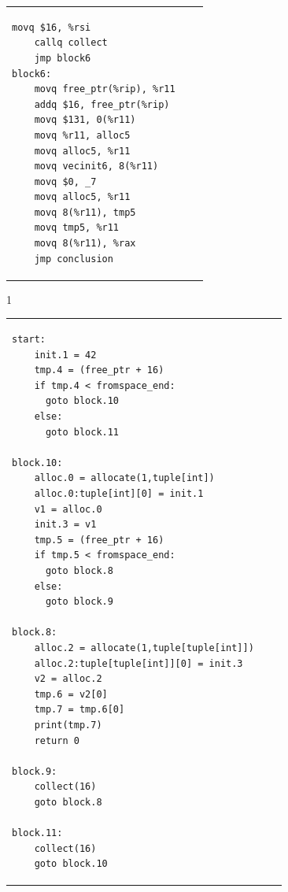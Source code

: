 \documentclass[7x10]{TimesAPriori_MIT}%
\def\pythonEd{1}
\providecommand{\BookEdition}{1}
\let\edition\BookEdition
\numberwithin{theorem}{chapter}
\numberwithin{definition}{chapter}
\numberwithin{equation}{chapter}
\begin{document}
\begin{figure}[tbp]
\begin{tcolorbox}[colback=white]
{\begin{tabular}{lll}
\begin{minipage}{0.4\textwidth}
\begin{lstlisting}[basicstyle=\ttfamily\scriptsize]
    movq $16, %rsi
    callq collect
    jmp block6
block6:
    movq free_ptr(%rip), %r11
    addq $16, free_ptr(%rip)
    movq $131, 0(%r11)
    movq %r11, alloc5
    movq alloc5, %r11
    movq vecinit6, 8(%r11)
    movq $0, _7
    movq alloc5, %r11
    movq 8(%r11), tmp5
    movq tmp5, %r11
    movq 8(%r11), %rax
    jmp conclusion
\end{lstlisting}
\end{minipage}
\end{tabular}
\fi}
{\if\edition\pythonEd    
\begin{tabular}{lll}
\begin{minipage}{0.5\textwidth}
\begin{lstlisting}[basicstyle=\ttfamily\scriptsize]
start:
    init.1 = 42
    tmp.4 = (free_ptr + 16)
    if tmp.4 < fromspace_end:
      goto block.10
    else:
      goto block.11

block.10:
    alloc.0 = allocate(1,tuple[int])
    alloc.0:tuple[int][0] = init.1
    v1 = alloc.0
    init.3 = v1
    tmp.5 = (free_ptr + 16)
    if tmp.5 < fromspace_end:
      goto block.8
    else:
      goto block.9

block.8:
    alloc.2 = allocate(1,tuple[tuple[int]])
    alloc.2:tuple[tuple[int]][0] = init.3
    v2 = alloc.2
    tmp.6 = v2[0]
    tmp.7 = tmp.6[0]
    print(tmp.7)
    return 0

block.9:
    collect(16)
    goto block.8

block.11:
    collect(16)
    goto block.10
\end{lstlisting}



    

    

\end{minipage}
\end{tabular}}
\end{tcolorbox}
\end{figure}
\end{document}
